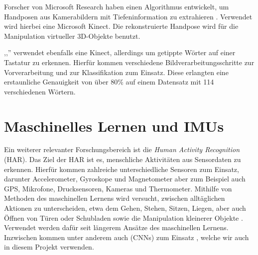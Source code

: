 Forscher von Microsoft Research haben einen Algorithmus entwickelt, um
Handposen aus Kamerabildern mit Tiefeninformation zu
extrahieren \citep{microsoft-hand-tracking}. Verwendet wird hierbei eine
Microsoft Kinect. Die rekonstruierte Handpose wird für die Manipulation
virtueller 3D-Objekte benutzt.

,,'' \citep{ellithorpe-kinect-typing}
verwendet ebenfalls eine Kinect, allerdings um getippte Wörter auf einer
Tastatur zu erkennen.  Hierfür kommen verschiedene Bildverarbeitungsschritte
zur Vorverarbeitung und  zur Klassifikation
zum Einsatz. Diese erlangten eine erstaunliche Genauigkeit von über 80\% auf
einem Datensatz mit 114 verschiedenen Wörtern.

\section{Maschinelles Lernen und IMUs}

Ein weiterer relevanter Forschungsbereich ist die \emph{Human Activity
Recognition} (HAR). Das Ziel der HAR ist es, menschliche Aktivitäten aus
Sensordaten zu erkennen. Hierfür kommen zahlreiche unterschiedliche Sensoren
zum Einsatz, darunter Accelerometer, Gyroskope und Magnetometer aber zum
Beispiel auch GPS, Mikrofone, Drucksensoren, Kameras und Thermometer. Mithilfe
von Methoden des maschinellen Lernens wird versucht, zwischen alltäglichen
Aktionen zu unterscheiden, etwa dem Gehen, Stehen, Sitzen, Liegen, aber auch
Öffnen von Türen oder Schubladen sowie die Manipulation kleinerer Objekte
\citep{lara-har}. Verwendet werden dafür seit längerem Ansätze des maschinellen
Lernens. Inzwischen kommen unter anderem auch  (CNNs) zum Einsatz \citep{dense_labeling}, welche wir auch in diesem
Projekt verwenden.


